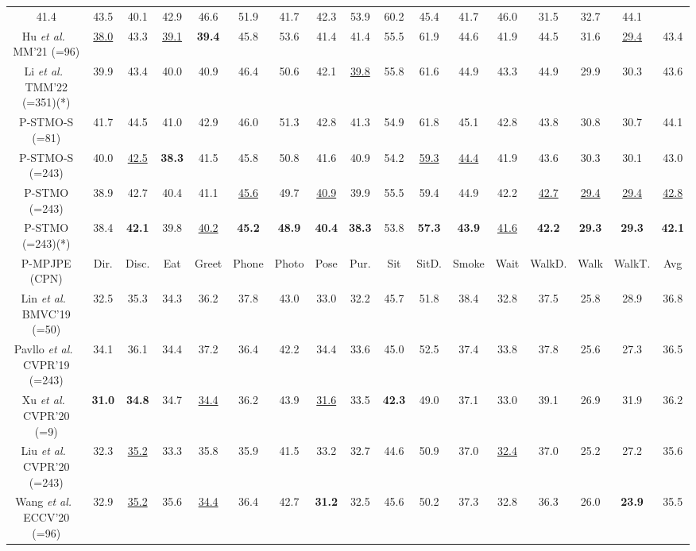 \documentclass[]{llncs}
\begin{document}
\begin{table}[t]
\begin{center}
{\begin{tabular}{c|ccccccccccccccc|c}
41.4&43.5&40.1&42.9&46.6&51.9&41.7&42.3&53.9&60.2&45.4&41.7&46.0&31.5&32.7&44.1\\
Hu \textit{et al.}~\cite{hu2021conditional} MM'21 (=96)&
\underline{38.0}&43.3&\underline{39.1}&\textbf{39.4}&45.8&53.6&41.4&41.4&55.5&61.9&44.6&41.9&44.5&31.6&\underline{29.4}&43.4\\
Li \textit{et al.}~\cite{li2022exploiting} TMM'22 (=351)(*)&
39.9&43.4&40.0&40.9&46.4&50.6&42.1&\underline{39.8}&55.8&61.6&44.9&43.3&44.9&29.9&30.3&43.6\\
\noalign{\smallskip}
\hline
\noalign{\smallskip}
P-STMO-S (=81)  &
41.7&44.5&41.0&42.9&46.0&51.3&42.8&41.3&54.9&61.8&45.1&42.8&43.8&30.8&30.7&44.1\\
P-STMO-S (=243)&
40.0&\underline{42.5}&\textbf{38.3}&41.5&45.8&50.8&41.6&40.9&54.2&\underline{59.3}&\underline{44.4}&41.9&43.6&30.3&30.1&43.0\\
P-STMO (=243)&
38.9&42.7&40.4&41.1&\underline{45.6}&49.7&\underline{40.9}&39.9&55.5&59.4&44.9&42.2&\underline{42.7}&\underline{29.4}&\underline{29.4}&\underline{42.8}\\
P-STMO (=243)(*)  &
38.4&\textbf{42.1}&39.8&\underline{40.2}&\textbf{45.2}&\textbf{48.9}&\textbf{40.4}&\textbf{38.3}&53.8&\textbf{57.3}&\textbf{43.9}&\underline{41.6}&\textbf{42.2}&\textbf{29.3}&\textbf{29.3}&\textbf{42.1}\\
\noalign{\smallskip}
\hline
\hline
\noalign{\smallskip}
P-MPJPE (CPN) & Dir. & Disc. & Eat & Greet & Phone & Photo & Pose & Pur. & Sit & SitD. & Smoke & Wait & WalkD. & Walk & WalkT. & Avg \\
\noalign{\smallskip}
\hline
\noalign{\smallskip}
Lin \textit{et al.}~\cite{lin2019trajectory} BMVC'19 (=50)&
32.5&35.3&34.3&36.2&37.8&43.0&33.0&32.2&45.7&51.8&38.4&32.8&37.5&25.8&28.9&36.8 \\
Pavllo \textit{et al.}~\cite{pavllo20193d} CVPR'19 (=243)& 34.1&36.1&34.4&37.2&36.4&42.2&34.4&33.6&45.0&52.5&37.4&33.8&37.8&25.6&27.3&36.5 \\
Xu \textit{et al.}~\cite{xu2020deep} CVPR'20 (=9)
&\textbf{31.0}&\textbf{34.8}&34.7&\underline{34.4}&36.2&43.9&\underline{31.6}&33.5&\textbf{42.3}&49.0&37.1&33.0&39.1&26.9&31.9&36.2\\
Liu \textit{et al.}~\cite{liu2020attention} CVPR'20 (=243)& 32.3&\underline{35.2}&33.3&35.8&35.9&41.5&33.2&32.7&44.6&50.9&37.0&\underline{32.4}&37.0&25.2&27.2&35.6 \\
Wang \textit{et al.}~\cite{wang2020motion} ECCV'20 (=96)
&32.9&\underline{35.2}&35.6&\underline{34.4}&36.4&42.7&\textbf{31.2}&32.5&45.6&50.2&37.3&32.8&36.3&26.0&\textbf{23.9}&35.5\\

\end{tabular}}
\end{center}
\end{table}
\end{document}
